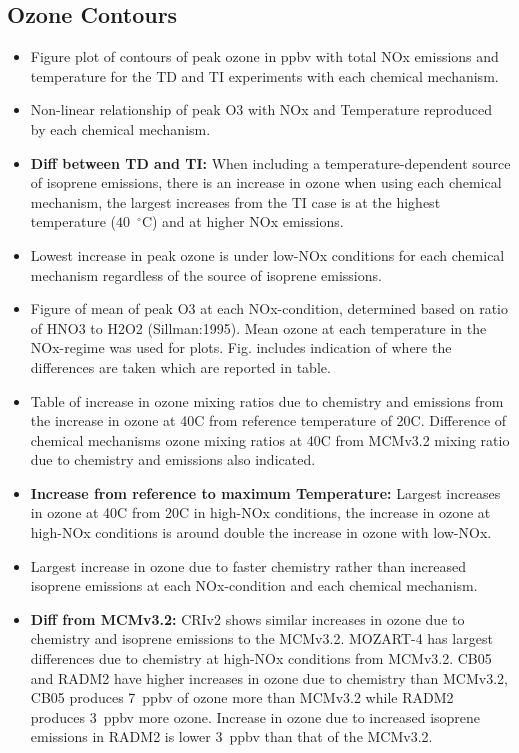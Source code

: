 \documentclass[11pt,a4paper]{article}
\begin{document}
\subsection{Ozone Contours}
\begin{itemize}
    \item Figure plot of contours of peak ozone in ppbv with total NOx emissions and temperature for the TD and TI experiments with each chemical mechanism.
    \item Non-linear relationship of peak O3 with NOx and Temperature reproduced by each chemical mechanism.
    \item \textbf{Diff between TD and TI:} When including a temperature-dependent source of isoprene emissions, there is an increase in ozone when using each chemical mechanism, the largest increases from the TI case is at the highest temperature ($40$~$^{\circ}$C) and at higher NOx emissions. 
    \item Lowest increase in peak ozone is under low-NOx conditions for each chemical mechanism regardless of the source of isoprene emissions.
    \item Figure of mean of peak O3 at each NOx-condition, determined based on ratio of HNO3 to H2O2 (Sillman:1995). Mean ozone at each temperature in the NOx-regime was used for plots. Fig. includes indication of where the differences are taken which are reported in table.
    \item Table of increase in ozone mixing ratios due to chemistry and emissions from the increase in ozone at 40C from reference temperature of 20C. Difference of chemical mechanisms ozone mixing ratios at 40C from MCMv3.2 mixing ratio due to chemistry and emissions also indicated.
    \item \textbf{Increase from reference to maximum Temperature:} Largest increases in ozone at 40C from 20C in high-NOx conditions, the increase in ozone at high-NOx conditions is around double the increase in ozone with low-NOx.
    \item Largest increase in ozone due to faster chemistry rather than increased isoprene emissions at each NOx-condition and each chemical mechanism.
    \item \textbf{Diff from MCMv3.2:} CRIv2 shows similar increases in ozone due to chemistry and isoprene emissions to the MCMv3.2. MOZART-4 has largest differences due to chemistry at high-NOx conditions from MCMv3.2. CB05 and RADM2 have higher increases in ozone due to chemistry than MCMv3.2, CB05 produces 7~ppbv of ozone more than MCMv3.2 while RADM2 produces 3~ppbv more ozone. Increase in ozone due to increased isoprene emissions in RADM2 is lower 3~ppbv than that of the MCMv3.2.
\end{itemize}
\end{document}

